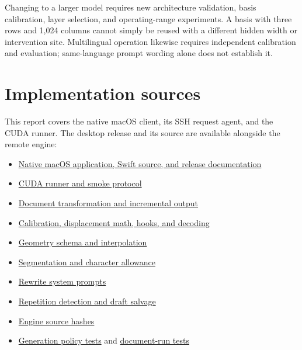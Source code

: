\documentclass[manuscript,screen,nonacm]{acmart}
\providecommand{\tightlist}{\setlength{\itemsep}{0pt}\setlength{\parskip}{0pt}}
\begin{document}
Changing to a larger model requires new architecture validation, basis
calibration, layer selection, and operating-range experiments. A basis
with three rows and 1,024 columns cannot simply be reused with a
different hidden width or intervention site. Multilingual operation
likewise requires independent calibration and evaluation; same-language
prompt wording alone does not establish it.

\section{Implementation sources}\label{implementation-sources}

This report covers the native macOS client, its SSH request agent, and the CUDA runner. The desktop release and its source are available alongside the remote engine:

\begin{itemize}
\tightlist
\item
  \href{https://huggingface.co/will-taggart/AFFECTOR-ARC/tree/main/macos}{Native macOS application, Swift source, and release documentation}
\item
  \href{https://huggingface.co/will-taggart/AFFECTOR-ARC/blob/main/run_arc.py}{CUDA
  runner and smoke protocol}
\item
  \href{https://huggingface.co/will-taggart/AFFECTOR-ARC/blob/main/document_run.py}{Document
  transformation and incremental output}
\item
  \href{https://huggingface.co/will-taggart/AFFECTOR-ARC/blob/main/engine/steering.py}{Calibration,
  displacement math, hooks, and decoding}
\item
  \href{https://huggingface.co/will-taggart/AFFECTOR-ARC/blob/main/engine/geometry.py}{Geometry
  schema and interpolation}
\item
  \href{https://huggingface.co/will-taggart/AFFECTOR-ARC/blob/main/engine/documents.py}{Segmentation
  and character allowance}
\item
  \href{https://huggingface.co/will-taggart/AFFECTOR-ARC/blob/main/engine/rewrite_policy.py}{Rewrite
  system prompts}
\item
  \href{https://huggingface.co/will-taggart/AFFECTOR-ARC/blob/main/engine/generation.py}{Repetition
  detection and draft salvage}
\item
  \href{https://huggingface.co/will-taggart/AFFECTOR-ARC/blob/main/ENGINE_MANIFEST.json}{Engine
  source hashes}
\item
  \href{https://huggingface.co/will-taggart/AFFECTOR-ARC/blob/main/tests/test_generation.py}{Generation
  policy tests} and
  \href{https://huggingface.co/will-taggart/AFFECTOR-ARC/blob/main/tests/test_document_run.py}{document-run
  tests}
\end{itemize}
\end{document}
